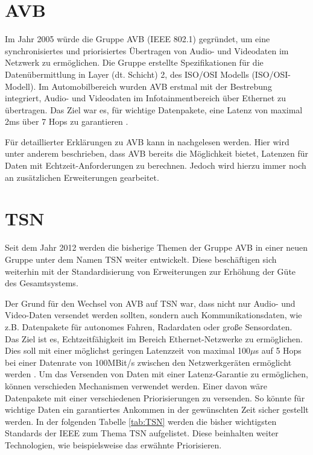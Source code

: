\section{\acl{AVB}}
Im Jahr 2005 würde die Gruppe \acf{AVB} (IEEE 802.1) gegründet, um eine synchronisiertes und priorisiertes Übertragen von Audio- und Videodaten im Netzwerk zu ermöglichen. Die Gruppe erstellte Spezifikationen für die Datenübermittlung in Layer (dt. Schicht) 2, des \acl{ISO}/\acl{OSI} Modells (\acs{ISO}/\acs{OSI}-Modell). Im Automobilbereich wurden \acs{AVB} erstmal mit der Bestrebung integriert, Audio- und Videodaten im Infotainmentbereich über Ethernet zu übertragen. Das Ziel war es, für wichtige Datenpakete, eine Latenz von maximal 2ms über 7 Hops zu garantieren \cite{AVB}.

Für detaillierter Erklärungen zu \acs{AVB} kann in \cite{AVBBook} nachgelesen werden. Hier wird unter anderem beschrieben, dass \ac{AVB} bereits die Möglichkeit bietet, Latenzen für Daten mit Echtzeit-Anforderungen zu berechnen. Jedoch wird hierzu immer noch an zusätzlichen Erweiterungen gearbeitet.

\section{\acf{TSN}}\label{ref:TSNGrundlagen}
Seit dem Jahr 2012 werden die bisherige Themen der Gruppe \acs{AVB} in einer neuen Gruppe unter dem Namen \acf{TSN} weiter entwickelt. Diese beschäftigen sich weiterhin mit der Standardisierung von Erweiterungen zur Erhöhung der Güte des Gesamtsystems. 

Der Grund für den Wechsel von \acs{AVB} auf \acs{TSN} war, dass nicht nur Audio- und Video-Daten versendet werden sollten, sondern auch Kommunikationsdaten, wie z.B. Daten\-pakete für autonomes Fahren, Radardaten oder große Sensordaten. Das Ziel ist es, Echtzeitfähigkeit im Bereich Ethernet-Netzwerke zu ermöglichen. Dies soll mit einer möglichst geringen Latenzzeit von maximal 100$\mu$s auf 5 Hops bei einer Datenrate von 100MBit/s zwischen den Netzwerkgeräten ermöglicht werden \cite{AutomotiveEthernet}. Um das Versenden von Daten mit einer Latenz-Garantie zu ermöglichen, können verschieden Mechanismen verwendet werden. Einer davon wäre Datenpakete mit einer verschiedenen Priorisierungen zu versenden. So könnte für wichtige Daten ein garantiertes Ankommen in der gewünschten Zeit sicher gestellt werden.
In der folgenden Tabelle \ref{tab:TSN} werden die bisher wichtigsten Standards der \acs{IEEE} zum Thema \acs{TSN} aufgelistet. Diese beinhalten weiter Technologien, wie beispielsweise das erwähnte Priorisieren.

